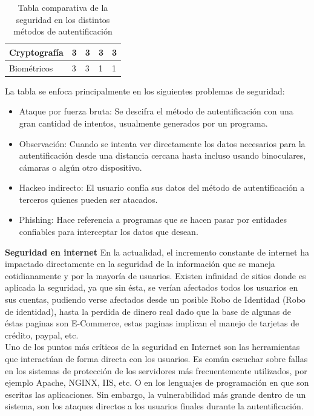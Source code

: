 \documentclass[12pt, a4paper, titlepage]{report}
\begin{document}
\begin{table}[H]
{\begin{tabular}{l|l|l|l|l|}
					\multicolumn{1}{|l|}{Cryptografía}                                                     & 3                                                                 & 3           & 3                                                          & 3        \\ \hline
					\multicolumn{1}{|l|}{Biométricos}                                                      & 3                                                                 & 3           & 1                                                          & 1        \\ \hline
				\end{tabular}
			}
			\caption[Seguridad en los métodos de autentificación]{Tabla comparativa de la seguridad en los distintos métodos de autentificaci\'on}
		\end{table}
		La tabla se enfoca principalmente en los siguientes problemas de seguridad: 
		
		\begin{itemize}
			\item Ataque por fuerza bruta: Se descifra el método de autentificaci\'on con una gran cantidad de intentos, usualmente generados por un programa.
			\item Observación: Cuando se intenta ver directamente los datos necesarios para la autentificaci\'on desde una distancia cercana hasta incluso usando binoculares, cámaras o algún otro dispositivo.
			\item Hackeo indirecto: El usuario confía sus datos del método de autentificaci\'on a terceros quienes pueden ser atacados. 
			\item Phishing: Hace referencia a programas que se hacen pasar por entidades confiables para interceptar los datos que desean.
		\end{itemize}
		
	    \textbf{Seguridad en internet}
	    En la actualidad, el incremento constante de internet ha impactado directamente en la seguridad de la información que se maneja cotidianamente y por la mayoría de usuarios. Existen infinidad de sitios donde es aplicada la seguridad, ya que sin ésta, se verían afectados todos los usuarios en  sus cuentas, pudiendo verse afectados desde un posible \Gls{Robo de Identidad} (Robo de identidad), hasta la perdida de dinero real dado que la base de algunas de éstas paginas son E-Commerce, estas paginas implican el manejo de tarjetas de crédito, paypal, etc.\\
		
		Uno de los puntos más críticos de la seguridad en Internet son las herramientas que interactúan de forma directa con los usuarios. Es común escuchar sobre fallas en los sistemas de protección de los servidores más frecuentemente utilizados, por ejemplo Apache, NGINX, IIS, etc. O en los lenguajes de programación en que son escritas las aplicaciones. \cite{refSeguridadWeb} Sin embargo, la vulnerabilidad más grande dentro de un sistema, son los ataques directos a los usuarios finales durante la autentificación.\\
	    
\end{document}
